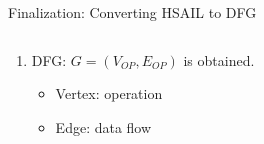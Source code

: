 \documentclass{beamer}
\begin{document}
\begin{CJK}{UTF8}{bkai}
\begin{frame}{Finalization: Converting HSAIL to DFG}
\begin{columns}
\begin{column}{0.55\textwidth}
\begin{enumerate}
{\begin{itemize}
                                \end{itemize}
                            }
                        \item <5->{DFG: $G = (V_{OP}, E_{OP})$ is obtained.
                                \begin{itemize}
                                    \item Vertex: operation
                                    \item Edge: data flow
                                \end{itemize}
                            }
                        \end{enumerate}
                    \end{column}
                \end{columns}
            \end{frame}


\end{CJK}
\end{document}
